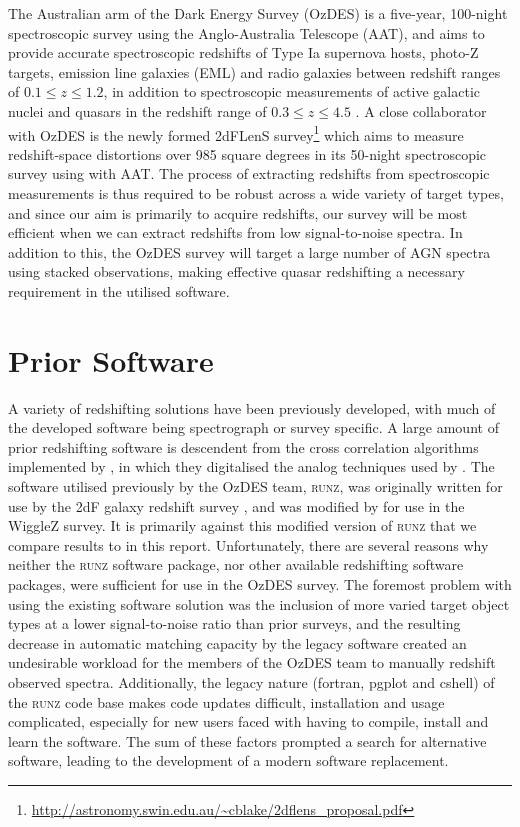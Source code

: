 \documentclass[iop]{emulateapj}
\newcommand{\runz}{\textsc{runz}}
\begin{document}
The Australian arm of the Dark Energy Survey (OzDES) is a five-year, 100-night spectroscopic survey using the Anglo-Australia Telescope (AAT), and aims to provide accurate spectroscopic redshifts of Type Ia supernova hosts, photo-Z targets, emission line galaxies (EML) and radio galaxies between redshift ranges of $0.1 \leq  z \leq 1.2$, in addition to spectroscopic measurements of active galactic nuclei and quasars in the redshift range of $0.3 \leq z \leq 4.5$ \cite{fang2015}. A close collaborator with OzDES is the newly formed 2dFLenS survey\footnote{\url{http://astronomy.swin.edu.au/~cblake/2dflens_proposal.pdf}} which aims to measure redshift-space distortions over 985 square degrees in its 50-night spectroscopic survey using with AAT.  The process of extracting redshifts from spectroscopic measurements is thus required to be robust across a wide variety of target types, and since our aim is primarily to acquire redshifts,  our survey will be most efficient when we can extract redshifts from low signal-to-noise spectra. In addition to this, the OzDES survey will target a large number of AGN spectra using stacked observations, making effective quasar redshifting a necessary requirement in the utilised software.


\section{Prior Software}

A variety of redshifting solutions have been previously developed, with much of the developed software being spectrograph or survey specific. A large amount of prior redshifting software is descendent from the cross correlation algorithms implemented by \citet{tonry1979survey}, in which they digitalised the analog techniques used by \citet{griffin1967photoelectric}. The software utilised previously by the OzDES team,  \runz{}, was originally written for use by the 2dF galaxy redshift survey \citep{colless2001}, and was modified by \citet{saunders2004} for use in the WiggleZ survey. It is primarily against this modified version of \runz{} that we compare results to in this report.  Unfortunately, there are several reasons why neither the \runz{} software package, nor other available redshifting software packages, were sufficient for use in the OzDES survey. The foremost problem with using the existing software solution was the inclusion of more varied target object types at a lower signal-to-noise ratio than prior surveys, and the resulting decrease in automatic matching capacity by the legacy software created an undesirable workload for the members of the OzDES team to manually redshift observed spectra. Additionally, the legacy nature (fortran, pgplot and cshell) of the \runz{} code base makes code updates difficult, installation and usage complicated, especially for new users faced with having to compile, install and learn the software. The sum of these factors prompted a search for alternative software, leading to the development of a modern software replacement.\\
\end{document}
